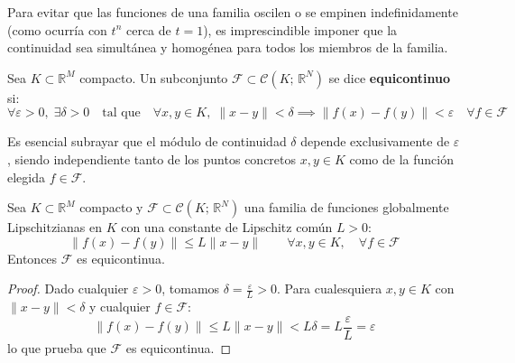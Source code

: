 Para evitar que las funciones de una familia oscilen o se empinen indefinidamente (como ocurría con $t^n$ cerca de $t = 1$), es imprescindible imponer que la continuidad sea simultánea y homogénea para todos los miembros de la familia.

\begin{definición}
    Sea $K \subset \mathbb{R}^M$ compacto. Un subconjunto $\mathcal{F} \subset \mathcal{C}(K; \, \mathbb{R}^N)$ se dice \textbf{equicontinuo} si:
    \[
        \forall \varepsilon > 0, \; \exists \delta > 0 \quad \text{tal que} \quad \forall x, y \in K, \; \|x - y\| < \delta \implies \|f(x) - f(y)\| < \varepsilon \quad \forall f \in \mathcal{F}
    \]
\end{definición}

Es esencial subrayar que el módulo de continuidad $\delta$ depende exclusivamente de $\varepsilon$, siendo independiente tanto de los puntos concretos $x, y \in K$ como de la función elegida $f \in \mathcal{F}$.

\begin{lema}
    Sea $K \subset \mathbb{R}^M$ compacto y $\mathcal{F} \subset \mathcal{C}(K; \, \mathbb{R}^N)$ una familia de funciones globalmente Lipschitzianas en $K$ con una constante de Lipschitz común $L > 0$:
    \[
        \|f(x) - f(y)\| \leq L \|x - y\| \qquad \forall x, y \in K, \quad \forall f \in \mathcal{F}
    \]
    Entonces $\mathcal{F}$ es equicontinua.
\end{lema}

\begin{proof}
    Dado cualquier $\varepsilon > 0$, tomamos $\delta = \frac{\varepsilon}{L} > 0$. Para cualesquiera $x, y \in K$ con $\|x - y\| < \delta$ y cualquier $f \in \mathcal{F}$:
    \[
        \|f(x) - f(y)\| \leq L \|x - y\| < L \delta = L \frac{\varepsilon}{L} = \varepsilon
    \]
    lo que prueba que $\mathcal{F}$ es equicontinua.
\end{proof}

